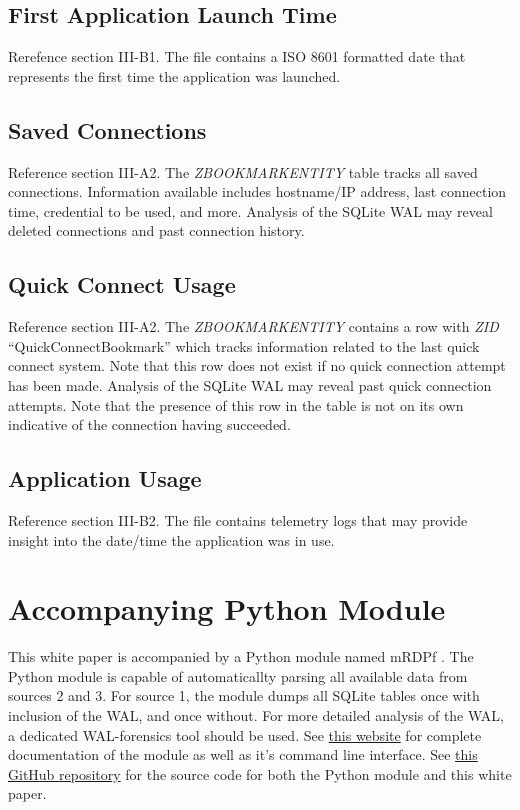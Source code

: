 \documentclass[journal]{IEEEtran}
\begin{document}
\subsection{First Application Launch Time}

Rerefence section III-B1. The file  contains a ISO 8601 formatted date that represents the first time the application was launched.

\subsection{Saved Connections}

Reference section III-A2. The \textit{ZBOOKMARKENTITY} table tracks all saved connections. Information available includes hostname/IP address, last connection time, credential to be used, and more. Analysis of the SQLite WAL may reveal deleted connections and past connection history.

\subsection{Quick Connect Usage}

Reference section III-A2. The \textit{ZBOOKMARKENTITY} contains a row with \textit{ZID} ``QuickConnectBookmark'' which tracks information related to the last quick connect system. Note that this row does not exist if no quick connection attempt has been made. Analysis of the SQLite WAL may reveal past quick connection attempts. Note that the presence of this row in the table is not on its own indicative of the connection having succeeded.

\subsection{Application Usage}

Reference section III-B2. The  file contains telemetry logs that may provide insight into the date/time the application was in use.

\section{Accompanying Python Module}

This white paper is accompanied by a Python module named mRDPf \cite{noauthor_jholtmannmrdpf_nodate}. The Python module is capable of automaticallty parsing all available data from sources 2 and 3. For source 1, the module dumps all SQLite tables once with inclusion of the WAL, and once without. For more detailed analysis of the WAL, a dedicated WAL-forensics tool should be used. See \href{https://jholtmann.github.io/mrdpf/}{this website} for complete documentation of the module as well as it's command line interface. See \href{https://github.com/jholtmann/mrdpf}{this GitHub repository} for the source code for both the Python module and this white paper.
\end{document}

